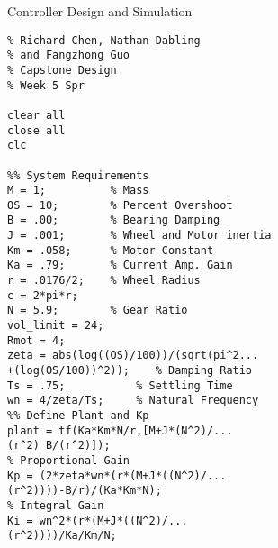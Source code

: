 \item{Controller Design and Simulation}
\begin{verbatim}
% Richard Chen, Nathan Dabling 
% and Fangzhong Guo 
% Capstone Design
% Week 5 Spr

clear all
close all
clc

%% System Requirements
M = 1;          % Mass
OS = 10;        % Percent Overshoot
B = .00;        % Bearing Damping
J = .001;       % Wheel and Motor inertia
Km = .058;      % Motor Constant
Ka = .79;       % Current Amp. Gain
r = .0176/2;    % Wheel Radius
c = 2*pi*r;
N = 5.9;        % Gear Ratio
vol_limit = 24;
Rmot = 4;
zeta = abs(log((OS)/100))/(sqrt(pi^2...
+(log(OS/100))^2));    % Damping Ratio
Ts = .75;           % Settling Time
wn = 4/zeta/Ts;     % Natural Frequency
%% Define Plant and Kp
plant = tf(Ka*Km*N/r,[M+J*(N^2)/...
(r^2) B/(r^2)]);
% Proportional Gain
Kp = (2*zeta*wn*(r*(M+J*((N^2)/...
(r^2))))-B/r)/(Ka*Km*N);   
% Integral Gain 
Ki = wn^2*(r*(M+J*((N^2)/...
(r^2))))/Ka/Km/N;          


\end{verbatim}
